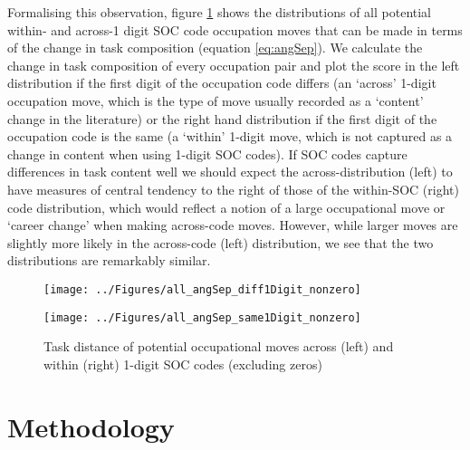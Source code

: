 \documentclass[preprint,12pt,authoryear]{elsarticle}
\begin{document}
\vspace{2mm}

Formalising this observation, figure \ref{fig:angSep_diff} shows the distributions of all potential within- and across-1 digit SOC code occupation moves that can be made in terms of the change in task composition (equation \ref{eq:angSep}). We calculate the change in task composition of every occupation pair and plot the score in the left distribution if the first digit of the occupation code differs (an `across' 1-digit occupation move, which is the type of move usually recorded as a `content' change in the literature) or the right hand distribution if the first digit of the occupation code is the same (a `within' 1-digit move, which is not captured as a change in content when using 1-digit SOC codes). If SOC codes capture differences in task content well we should expect the across-distribution (left) to have measures of central tendency to the right of those of the within-SOC (right) code distribution, which would reflect a notion of a large occupational move or `career change' when making across-code moves. However, while larger moves are slightly more likely in the across-code (left) distribution, we see that the two distributions are remarkably similar. 

\begin{figure}[H]
	\centering
	\begin{minipage}{.5\textwidth}
		\centering
		\texttt{[image: ../Figures/all\_angSep\_diff1Digit\_nonzero]}
	\end{minipage}%
	\begin{minipage}{.5\textwidth}
		\centering
		\texttt{[image: ../Figures/all\_angSep\_same1Digit\_nonzero]}
	\end{minipage}%
	\caption{Task distance of potential occupational moves across (left) and within (right) 1-digit SOC codes (excluding zeros)}
	\label{fig:angSep_diff}
\end{figure}


\begin{table}[H]
	\centering
	 
	\caption{Quantiles of task similarity of potential occupational moves across (left) and within (right) 1-digit SOC codes (including zeros)}
	\label{fig:angSep_quantile_diff_same}
\end{table}


\section{Methodology}
\label{sec:Model}
\end{document}
